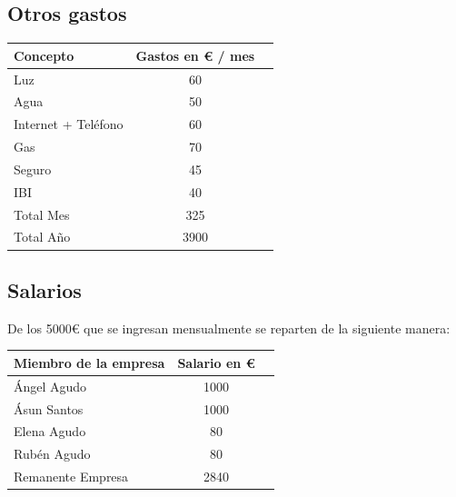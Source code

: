 \subsection{Otros gastos}

\begin{tabular}{l*{1}{c}r}
    Concepto                   & Gastos en € / mes & \\
    \hline
    Luz                        & 60 & \\
    Agua                       & 50 & \\
    Internet + Teléfono        & 60 & \\
    Gas                        & 70 & \\
    Seguro                     & 45 & \\
    IBI                        & 40 & \\
    \hline
    Total Mes                  & 325 & \\
    Total A\~{n}o              & 3900 &\\
\end{tabular}


\subsection{Salarios}
De los 5000€ que se ingresan mensualmente se reparten de la siguiente manera:
\newline
\newline
\begin{tabular}{l*{1}{c}r}
    Miembro de la empresa     & Salario en € & \\
    \hline
    Ángel Agudo               & 1000 & \\
    Ásun Santos               & 1000 & \\
    Elena Agudo               & 80 & \\
    Rubén Agudo               & 80 & \\
    \hline
    Remanente Empresa         & 2840 & \\
\end{tabular}

